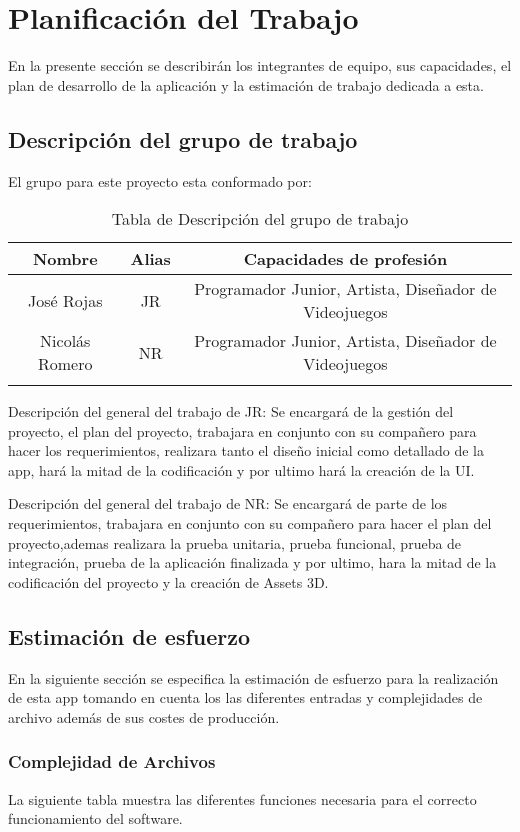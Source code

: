 \section{Planificación del Trabajo}
En la presente sección se describirán los integrantes de equipo, sus capacidades, el plan de desarrollo de la aplicación y la estimación de trabajo dedicada a esta.

\subsection{Descripción del grupo de trabajo}
El grupo para este proyecto esta conformado por:

\begin{longtable}{|c|c|c|}
\hline 
Nombre & Alias & Capacidades de profesión \\ 
\hline 
José Rojas & JR & Programador Junior, Artista, Diseñador de Videojuegos \\ 
\hline 
Nicolás Romero & NR & Programador Junior, Artista, Diseñador de Videojuegos \\ 
\hline 
\caption{Tabla de Descripción del grupo de trabajo}
\label{tab1}
\end{longtable} 

Descripción del general del trabajo de JR: Se encargará de la gestión del proyecto, el
plan del proyecto, trabajara en conjunto con su compañero para hacer los requerimientos,
realizara tanto el diseño inicial como detallado de la app, hará la mitad de la codificación y por ultimo hará la creación de la UI.

Descripción del general del trabajo de NR: Se encargará de parte de los requerimientos,
trabajara en conjunto con su compañero para hacer el plan del proyecto,ademas realizara la
prueba unitaria, prueba funcional, prueba de integración, prueba de la aplicación finalizada
y por ultimo, hara la mitad de la codificación del proyecto y la creación de Assets 3D.


\subsection{Estimación de esfuerzo}
En la siguiente sección se especifica la estimación de esfuerzo para la realización de esta app tomando en cuenta los las diferentes entradas y complejidades de archivo además de sus costes de producción.

\subsubsection{Complejidad de Archivos}
La siguiente tabla muestra las diferentes funciones necesaria para el correcto funcionamiento del software.

